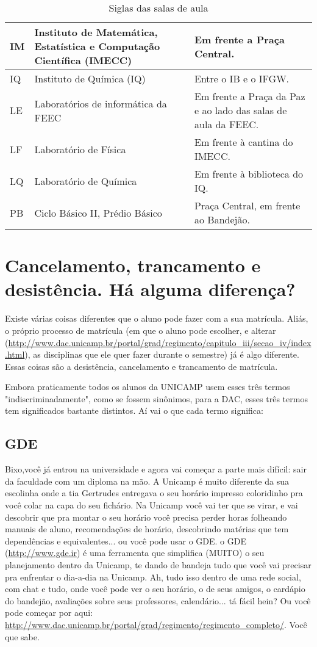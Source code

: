 \documentclass[a4paper,10pt, twocolumn]{article}
\begin{document}
\begin{center}
\begin{table*}[ht!]
{\begin{tabular}{|l|p{6cm}|p{8cm}|}
 IM  &  Instituto de Matemática, Estatística e Computação Científica (IMECC)  &  Em frente a Praça Central.\tabularnewline \hline

 IQ  &  Instituto de Química (IQ)  &  Entre o IB e o IFGW.\tabularnewline \hline

 LE  &  Laboratórios de informática da FEEC  &  Em frente a Praça da Paz e ao lado das salas de aula da FEEC.\tabularnewline \hline

 LF  &  Laboratório de Física  &  Em frente à cantina do IMECC.\tabularnewline \hline

 LQ  &  Laboratório de Química  &  Em frente à biblioteca do IQ.\tabularnewline \hline

 PB  &  Ciclo Básico II, Prédio Básico  &  Praça Central, em frente ao Bandejão.\tabularnewline \hline

\end{tabular}
}
\hfill{}
\caption{Siglas das salas de aula}
\label{tab:institutos}
\end{table*}
\end{center}
\section{Cancelamento, trancamento e desistência. Há alguma diferença?}
Existe várias coisas diferentes que o aluno pode fazer com a sua matrícula.
Aliás, o próprio processo de matrícula (em que o aluno pode escolher, e alterar
(\url{http://www.dac.unicamp.br/portal/grad/regimento/capitulo_iii/secao_iv/index.html}),
as disciplinas que ele quer fazer durante o semestre) já é algo diferente. Essas
coisas são a desistência, cancelamento e trancamento de matrícula.

Embora praticamente todos os alunos da UNICAMP usem esses três termos
"indiscriminadamente", como se fossem sinônimos, para a DAC, esses três termos
tem significados bastante distintos. Aí vai o que cada termo significa:

\subsection{GDE}
Bixo,você já entrou na universidade e agora vai começar a parte mais difícil:
sair da faculdade com um diploma na mão.  A Unicamp é muito diferente da sua
escolinha onde a tia Gertrudes entregava o seu horário impresso coloridinho pra
você colar na capa do seu fichário. Na Unicamp você vai ter que se virar, e vai
descobrir que pra montar o seu horário você precisa perder horas folheando
manuais de aluno, recomendações de horário, descobrindo matérias que tem
dependências e equivalentes... ou você pode usar o GDE.  o GDE
(\url{http://www.gde.ir}) é uma ferramenta que simplifica (MUITO) o seu
planejamento dentro da Unicamp, te dando de bandeja tudo que você vai precisar
pra enfrentar o dia-a-dia na Unicamp.  Ah, tudo isso dentro de uma rede social,
com chat e tudo, onde você pode ver o seu horário, o de seus amigos, o cardápio
do bandejão, avaliações sobre seus professores, calendário... tá fácil hein?  Ou
você pode começar por aqui:
\url{http://www.dac.unicamp.br/portal/grad/regimento/regimento_completo/}. Você
que sabe.
\end{document}

